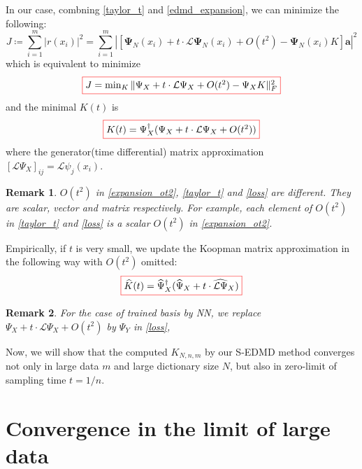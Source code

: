 \documentclass{article}[11]
\newtheorem*{remark}{Remark}
\begin{document}
In our case, combning \eqref{taylor_t} and \eqref{edmd_expansion}, we can minimize the following:
\begin{equation*}
	J \coloneqq \sum_{i=1}^m \left| r(x_i) \right|^2 = \sum_{i=1}^m \left| \left[\mathbf{\Psi}_N(x_i) + t \cdot \mathcal{L}\mathbf{\Psi}_N(x_i) + O(t^2) - \mathbf{\Psi}_N(x_i)K\right]\mathbf{a} \right|^2
\end{equation*}
which is equivalent to minimize 
\begin{equation}\label{loss}
	\fcolorbox{red}{white}{$J = \min_{K} \| \Psi_X + t \cdot \mathcal{L}\Psi_X + O(t^2) - \Psi_X K \|_F^2$}
\end{equation}
and the minimal $K(t)$ is
\begin{equation}\label{Koopman_semigroup_formula}
	\fcolorbox{red}{white}{$K(t) = \Psi_X^{\dagger}(\Psi_X + t \cdot \mathcal{L}\Psi_X + O(t^2))$}
\end{equation}
where the generator(time differential) matrix approximation $\left[\mathcal{L}\Psi_X\right]_{ij} = \mathcal{L}\psi_j(x_i)$. 
\begin{remark}
	$O(t^2)$ in \eqref{expansion_ot2}, \eqref{taylor_t} and \eqref{loss} are different. They are scalar, vector and matrix respectively. For example, each element of $O(t^2)$ in \eqref{taylor_t} and \eqref{loss} is a scalar $O(t^2)$ in \eqref{expansion_ot2}.
\end{remark}

Empirically, if $t$ is very small, we update the Koopman matrix approximation in the following way with $O(t^2)$ omitted:
\begin{equation*}
	\fcolorbox{red}{white}{$\widehat{K}(t) = \widehat{\Psi}_X^{\dagger}(\widehat{\Psi}_X + t \cdot \widehat{\mathcal{L}\Psi}_X)$}
\end{equation*}
\begin{remark}
	For the case of trained basis by NN, we replace $\Psi_X + t \cdot \mathcal{L}\Psi_X + O(t^2)$ by $\Psi_Y$ in \eqref{loss}, 
\end{remark}

Now, we will show that the computed $K_{N,n,m}$ by our S-EDMD method converges not only in large data $m$ and large dictionary size $N$, but also in zero-limit of sampling time $t=1/n$.

\newpage
\section{Convergence in the limit of large data}
\end{document}

